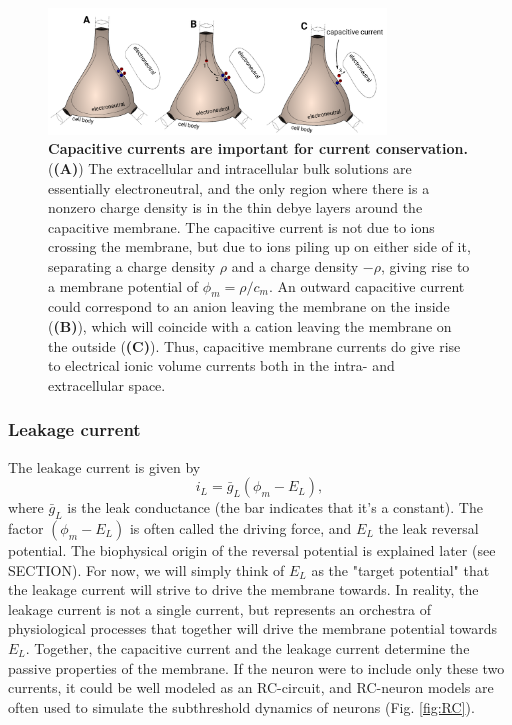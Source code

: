 \begin{figure}[!ht]
\begin{center}
\includegraphics[width=0.8\textwidth]{Fig02/capacitive_currents.pdf}
\end{center}
\caption{\textbf{Capacitive currents are important for current conservation.}  (\textbf{(A)}) The extracellular and intracellular bulk solutions are essentially electroneutral, and the only region where there is a nonzero charge density is in the thin debye layers around the capacitive membrane. The capacitive current is not due to ions crossing the membrane, but due to ions piling up on either side of it, separating a charge density $\rho$ and a charge density $-\rho$, giving rise to a membrane potential of $\phi_m = \rho/c_m$. An outward capacitive current could correspond to an anion leaving the membrane on the inside (\textbf{(B)}), which will coincide with a cation leaving the membrane on the outside (\textbf{(C)}). Thus, capacitive membrane currents do give rise to electrical ionic volume currents both in the intra- and extracellular space.
}
\label{fig:capacitive_currents}
\end{figure}


\subsubsection{Leakage current}
The leakage current is given by
\begin{equation}
i_L = \bar{g}_L (\phi_m - E_L),
\label{eq:HHleak}
\end{equation}
where $\bar{g}_L$ is the leak conductance (the bar indicates that it's a constant). The factor $(\phi_m - E_L)$ is often called the driving force, and $E_L$ the leak reversal potential. The biophysical origin of the reversal potential is explained later (see SECTION). For now, we will simply think of $E_L$ as the "target potential" that the leakage current will strive to drive the membrane towards. In reality, the leakage current is not a single current, but represents an orchestra of physiological processes that together will drive the membrane potential towards $E_L$. Together, the capacitive current and the leakage current determine the passive properties of the membrane. If the neuron were to include only these two currents, it could be well modeled as an RC-circuit, and RC-neuron models are often used to simulate the subthreshold dynamics of neurons (Fig. \ref{fig:RC}). 

